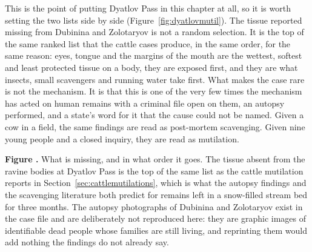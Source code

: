 This is the point of putting Dyatlov Pass in this chapter at all, so it is worth setting the two
lists side by side (Figure~\ref{fig:dyatlovmutil}). The tissue reported missing from Dubinina and
Zolotaryov is not a random selection. It is the top of the same ranked list that the cattle cases
produce, in the same order, for the same reason: eyes, tongue and the margins of the mouth are the
wettest, softest and least protected tissue on a body, they are exposed first, and they are what
insects, small scavengers and running water take first. What makes the case rare is not the
mechanism. It is that this is one of the very few times the mechanism has acted on human remains
with a criminal file open on them, an autopsy performed, and a state's word for it that the cause
could not be named. Given a cow in a field, the same findings are read as post-mortem scavenging.
Given nine young people and a closed inquiry, they are read as mutilation.

\Needspace*{3.3in}
\begin{center}
\label{fig:dyatlovmutil}%
\begin{figpanel}[width=0.96\textwidth]
\centering
{\setlength{\fboxsep}{0pt}\setlength{\fboxrule}{0.5pt}%
}\par\vspace{3pt}
{\RaggedRight\scriptsize\color{steel}\textbf{\textcolor{ufogreenink}{Figure \thefigph.}}
What is missing, and in what order it goes. The tissue absent from the ravine bodies at Dyatlov
Pass is the top of the same list as the cattle mutilation reports in
Section~\ref{sec:cattlemutilations}, which is what the autopsy findings and the scavenging
literature both predict for remains left in a snow-filled stream bed for three months. The
autopsy photographs of Dubinina and Zolotaryov exist in the case file and are deliberately not
reproduced here: they are graphic images of identifiable dead people whose families are still
living, and reprinting them would add nothing the findings do not already say.\par
{}\par}
\end{figpanel}
\end{center}
\vspace{6pt}

